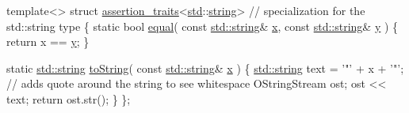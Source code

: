 \begin{DoxyCode}
\textcolor{keyword}{template}<>
\textcolor{keyword}{struct }\hyperlink{structassertion__traits}{assertion\_traits}<\hyperlink{_portability_8h_aafb7a81554b1c813a000b5dea7cf76d8}{std}::\hyperlink{glew_8h_ae84541b4f3d8e1ea24ec0f466a8c568b}{string}>   \textcolor{comment}{// specialization for the std::string type}
\{
  \textcolor{keyword}{static} \textcolor{keywordtype}{bool} \hyperlink{structassertion__traits_a287c07a4e171256a0128201c7e4c4228}{equal}( \textcolor{keyword}{const} \hyperlink{glew_8h_ae84541b4f3d8e1ea24ec0f466a8c568b}{std::string}& \hyperlink{glew_8h_ad77deca22f617d3f0e0eb786445689fc}{x}, \textcolor{keyword}{const} \hyperlink{glew_8h_ae84541b4f3d8e1ea24ec0f466a8c568b}{std::string}& 
      \hyperlink{glew_8h_a9298c7ad619074f5285b32c6b72bfdea}{y} )
  \{
    \textcolor{keywordflow}{return} x == \hyperlink{glew_8h_a9298c7ad619074f5285b32c6b72bfdea}{y};
  \}

  \textcolor{keyword}{static} \hyperlink{glew_8h_ae84541b4f3d8e1ea24ec0f466a8c568b}{std::string} \hyperlink{structassertion__traits_a1c96296fb44902b4f22d99b9c3cc7749}{toString}( \textcolor{keyword}{const} \hyperlink{glew_8h_ae84541b4f3d8e1ea24ec0f466a8c568b}{std::string}& 
      \hyperlink{glew_8h_ad77deca22f617d3f0e0eb786445689fc}{x} )
  \{
    \hyperlink{glew_8h_ae84541b4f3d8e1ea24ec0f466a8c568b}{std::string} text = \textcolor{charliteral}{'"'} + x + \textcolor{charliteral}{'"'};    \textcolor{comment}{// adds quote around the string to see whitespace}
    OStringStream ost;
    ost << text;
    \textcolor{keywordflow}{return} ost.str();
  \}
\};
\end{DoxyCode}
 

